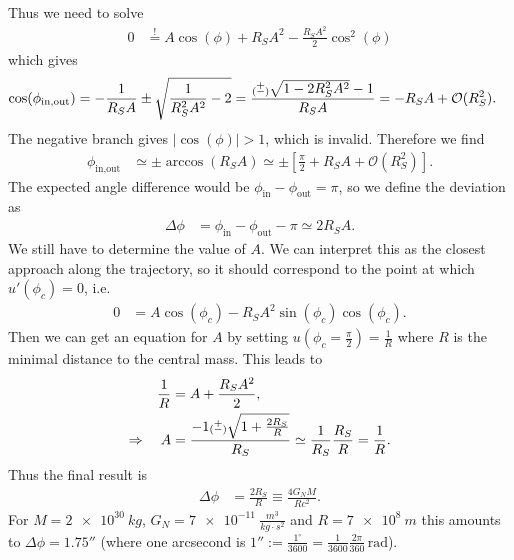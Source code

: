 \documentclass[english, parskip=full]{scrartcl}
\newcommand{\klam}{}
\newcommand{\tecxt}{}
\begin{document}
Thus we need to solve
\begin{align}
0 &\overset{!}{=} A\cos(\phi) + R_SA^2 - \frac{R_SA^2}{2} \cos^2(\phi)
\end{align}
which gives
\begin{align}
\cos(\phi_\tecxt\text{in,out}) &= -\frac{1}{R_SA} \pm \sqrt{\frac{1}{R_S^2A^2} - 2} = \frac{\substack{+\vspace{-0.1cm} \\ (-)} \sqrt{1 - 2R_S^2A^2} - 1}{R_SA} = -R_SA + \mathcal{O}(R_S^2).
\end{align}
The negative branch gives $|\cos(\phi)|>1$, which is invalid.
Therefore we find
\begin{align}
\phi_\tecxt\text{in,out} &\simeq \pm \arccos\left( R_SA \right) \simeq \pm \klam\left[ \frac{\pi}{2} + R_SA + \mathcal{O}(R_S^2) \right].
\end{align}
The expected angle difference would be $\phi_\text{in} - \phi_\text{out} = \pi$, so we define the deviation as
\begin{align}
\Delta\phi &= \phi_\text{in} - \phi_\text{out} - \pi \simeq 2R_SA.
\end{align}
We still have to determine the value of $A$.
We can interpret this as the closest approach along the trajectory, so it should correspond to the point at which $u'(\phi_c)=0$, i.e.
\begin{align}
0 &= A\cos(\phi_c) -R_SA^2\sin(\phi_c)\cos(\phi_c).
\end{align}
Then we can get an equation for $A$ by setting
$u \left( \phi_c=\frac{\pi}{2} \right) = \frac{1}{R}$ where $R$ is the minimal distance to the central mass.
This leads to
\begin{align}
\frac{1}{R} &= A + \frac{R_SA^2}{2},\\
\Rightarrow\ \ \ A &= \frac{-1 \substack{+\vspace{-0.1cm}\\(-)} \sqrt{1 + \frac{2R_S}{R}}}{R_S} \simeq \frac{1}{R_S} \frac{R_S}{R} = \frac{1}{R}.
\end{align}
Thus the final result is
\begin{align}
\Delta \phi &= \frac{2R_S}{R} \equiv \frac{4G_NM}{Rc^2}.
\end{align}
For $M=\SI{2e30}{kg}$, $G_N=\SI{7e-11}{\frac{m^3}{kg\cdot s^2}}$ and $R=\SI{7e8}{m}$ this amounts to $\Delta \phi = 1.75''$ (where one arcsecond is $1'' := \frac{1^\circ}{3600} = \frac{1}{3600} \frac{2\pi}{360}\,\tecxt\text{rad}$).
\end{document}
